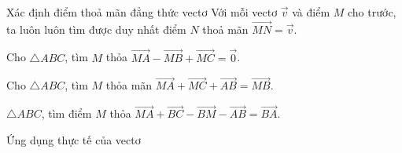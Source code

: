 \begin{dang}{Xác định điểm thoả mãn đẳng thức vectơ}
	Với mỗi vectơ $\overrightarrow{v}$ và điểm $M$ cho trước, ta luôn luôn tìm được duy nhất điểm $N$ thoả mãn $\overrightarrow{MN} = \overrightarrow{v}$.
\end{dang}

\begin{bt}%
	Cho $\triangle ABC$, tìm $M$ thỏa $\overrightarrow{MA}-\overrightarrow{MB}+\overrightarrow{MC}=\overrightarrow{0}$.
\end{bt}

\begin{bt}%
	Cho $\triangle ABC$, tìm $M$ thỏa mãn  $\overrightarrow{MA}+\overrightarrow{MC}+\overrightarrow{AB}=\overrightarrow{MB}$.
\end{bt}

\begin{bt}%
	$\triangle ABC$, tìm điểm $M$ thỏa $\overrightarrow{MA}+\overrightarrow{BC}-\overrightarrow{BM}-\overrightarrow{AB}=\overrightarrow{BA}$.
\end{bt}
\begin{dang}{Ứng dụng thực tế của vectơ}

\end{dang}

